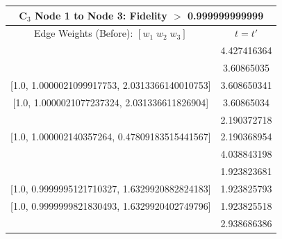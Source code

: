 \documentclass[reprint, aps, 12pt, floatfix]{revtex4-2}
\begin{document}
\begin{center}
    \begin{tabular}{||c c||}
        \multicolumn{2}{c}{C$_3$ Node 1 to Node 3: Fidelity $>$ 0.999999999999}\\
        \hline
        Edge Weights (Before): $[w_1 \; w_2 \; w_3]$&$t=t'$\\
        \hline
        [1.0, 1.0000056271301678, 0.23652567775072858]&4.427416364\\
        \hline
        [1.0, 1.000002106021208, 2.031336609147502]&3.60865035\\

        [1.0, 1.0000021099917753, 2.0313366140010753]&3.608650341\\

        [1.0, 1.0000021077237324, 2.031336611826904]&3.60865034\\
        \hline
        [1.0, 0.9999978618377054, 0.47809105049509043]&2.190372718\\

        [1.0, 1.000002140357264, 0.47809183515441567]&2.190368954\\
        \hline
        [1.0, 1.0000004129507405, 1.2964078289722214]&4.038843198\\
        \hline
        [1.0, 1.0000004683087362, 1.632994261899121]&1.923823681\\

        [1.0, 0.9999995121710327, 1.6329920882824183]&1.923825793\\

        [1.0, 0.9999999821830493, 1.6329920402749796]&1.923825518\\
        \hline
        [1.0, 1.0000037241144935, 3.20713969861044]&2.938686386\\
        \hline
    \end{tabular}
\end{center}
\end{document}
